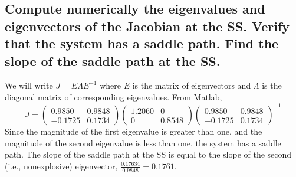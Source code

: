 \documentclass[11pt]{article} %
\begin{document}
\subsection{Compute numerically the eigenvalues and eigenvectors of the Jacobian at the SS. Verify that the system has a saddle path. Find the slope of the saddle path at the SS.}
We will write $J = E\Lambda E^{-1}$ where $E$ is the matrix of eigenvectors and $\Lambda$ is the diagonal matrix of corresponding eigenvalues. From Matlab,
\begin{equation*}
 J = \begin{pmatrix} 0.9850 & 0.9848 \\ -0.1725 & 0.1734 \end{pmatrix}  \begin{pmatrix} 1.2060 & 0 \\ 0 & 0.8548 \end{pmatrix}  \begin{pmatrix} 0.9850 & 0.9848 \\ -0.1725 & 0.1734 \end{pmatrix}^{-1}
\end{equation*}
Since the magnitude of the first eigenvalue is greater than one, and the magnitude of the second eigenvalue is less than one, the system has a saddle path. The slope of the saddle path at the SS is equal to the slope of the second (i.e., nonexplosive) eigenvector, $\frac{0.17634}{0.9848} = 0.1761.$
\end{document}
